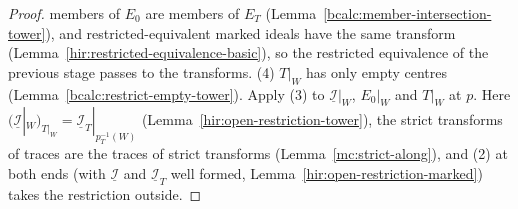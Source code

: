 \begin{proof}
members of \(E_0\) are members of \(E_T\) (Lemma~\ref{bcalc:member-intersection-tower}), and restricted-equivalent marked ideals have the same transform
(Lemma~\ref{hir:restricted-equivalence-basic}), so the restricted equivalence of the previous stage passes to the transforms.
(4) \(T|_W\) has only empty centres (Lemma~\ref{bcalc:restrict-empty-tower}). Apply (3) to \(\underline{\mathcal I}|_W\), \(E_0|_W\) and \(T|_W\) at \(p\). Here
\((\underline{\mathcal I}|_W)_{T|_W}=\underline{\mathcal I}_T|_{p_T^{-1}(W)}\) (Lemma~\ref{hir:open-restriction-tower}), the strict transforms of traces are the traces of strict transforms
(Lemma~\ref{mc:strict-along}), and (2) at both ends (with \(\underline{\mathcal I}\) and \(\underline{\mathcal I}_T\) well formed, Lemma~\ref{hir:open-restriction-marked}) takes the
restriction outside.
\end{proof}

